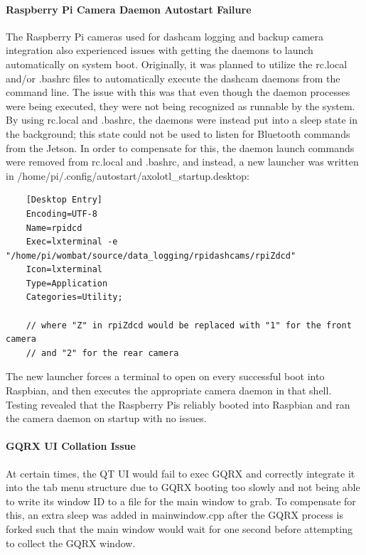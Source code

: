 \documentclass[onecolumn, draftclsnofoot, 10pt, compsoc]{IEEEtran}
\begin{document}
\paragraph{\textbf{Raspberry Pi Camera Daemon Autostart Failure}}
The Raspberry Pi cameras used for dashcam logging and backup camera integration also experienced issues with getting the daemons to launch automatically on system boot. Originally, it was planned to utilize the rc.local and/or .bashrc files to automatically execute the dashcam daemons from the command line. The issue with this was that even though the daemon processes were being executed, they were not being recognized as runnable by the system. By using rc.local and .bashrc, the daemons were instead put into a sleep state in the background; this state could not be used to listen for Bluetooth commands from the Jetson. In order to compensate for this, the daemon launch commands were removed from rc.local and .bashrc, and instead, a new launcher was written in /home/pi/.config/autostart/axolotl\_startup.desktop: \par

\begin{verbatim}
    [Desktop Entry]
    Encoding=UTF-8
    Name=rpidcd
    Exec=lxterminal -e "/home/pi/wombat/source/data_logging/rpidashcams/rpiZdcd"
    Icon=lxterminal
    Type=Application
    Categories=Utility;
    
    // where "Z" in rpiZdcd would be replaced with "1" for the front camera
    // and "2" for the rear camera
\end{verbatim}

The new launcher forces a terminal to open on every successful boot into Raspbian, and then executes the appropriate camera daemon in that shell. Testing revealed that the Raspberry Pis reliably booted into Raspbian and ran the camera daemon on startup with no issues.\par

\paragraph{\textbf{GQRX UI Collation Issue}}
At certain times, the QT UI would fail to exec GQRX and correctly integrate it into the tab menu structure due to GQRX booting too slowly and not being able to write its window ID to a file for the main window to grab. To compensate for this, an extra sleep was added in mainwindow.cpp after the GQRX process is forked such that the main window would wait for one second before attempting to collect the GQRX window.
\newpage
\end{document}
